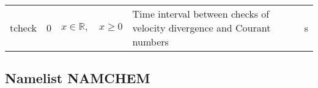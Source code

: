 \documentclass[twoside,11pt,fleqn,a4paper,english,openright]{report}
\begin{document}
\begin{center}
  \tabletail{
        &&&&\\
        \hline
  }
  \tablelasttail{
        &&&&\\
        \hline
  }
\begin{supertabular}{|l|p{1.6cm}|p{4cm}|p{6cm}|l|}
  tcheck	& 0	& $x \in \mathbb{R}, \quad x\geq 0$	& Time interval between checks of velocity divergence and Courant numbers	& s\\
\end{supertabular}
\end{center}

\subsection{Namelist NAMCHEM}\label{par:chem}
\end{document}
